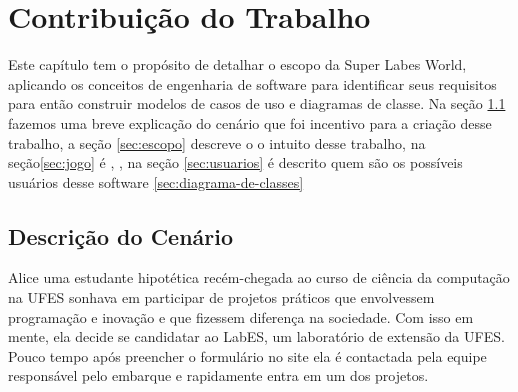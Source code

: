\chapter{Contribuição do Trabalho}
\label{sec-contribuicao}



Este capítulo tem o propósito de detalhar o escopo da Super Labes World, aplicando os conceitos de engenharia de software para identificar seus requisitos para então construir modelos de casos de uso e diagramas de classe. Na seção \ref{sec:descricao-do-cenario} fazemos uma breve explicação do cenário que foi incentivo para a criação desse trabalho, a seção \ref{sec:escopo} descreve o o intuito desse trabalho, na seção\ref{sec:jogo} é ,  , na seção \ref{sec:usuarios} é descrito quem são os possíveis usuários desse software \ref{sec:diagrama-de-classes}
\section{Descrição do Cenário}
\label{sec:descricao-do-cenario}
Alice uma estudante hipotética recém-chegada ao curso de ciência da computação na UFES sonhava em participar de projetos práticos que envolvessem programação e inovação e que fizessem diferença na sociedade. Com isso em mente, ela decide se candidatar ao LabES, um laboratório de extensão da UFES. Pouco tempo após preencher o formulário no site ela é contactada pela equipe responsável pelo embarque e rapidamente entra em um dos projetos.

